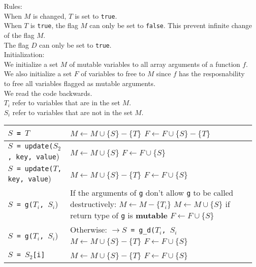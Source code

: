 \documentclass[12pt,a4paper]{article}
\newcommand{\cl}[1]{\texttt{#1}}
\newcommand{\mut}{  \textbf{ mutable } }
\begin{document}
Rules:\\
When $M$ is changed, $T$ is set to \cl{true}.\\
When $T$ is \cl{true}, the flag $M$ can only be set to \cl{false}.
This prevent infinite change of the flag $M$.\\
The flag $D$ can only be set to \cl{true}.\\



Initialization:\\


We initialize a set $M$ of mutable variables to all array arguments of a function $f$.
We also initialize a set $F$ of variables to free to $M$ since $f$ has the resposnability to free all variables flagged as mutable arguments.\\

We read the code backwards.\\
$T_i$ refer to variables that are in the set $M$.\\
$S_i$ refer to variables that are not in the set $M$.

\begin{tabular}{|p{60mm}|p{90mm}|}
\hline
\cl{$S$ = $T$} & $M \leftarrow M \cup \{ S \} - \{T\}$ \newline $F \leftarrow F \cup \{ S \} - \{T\}$  \\ \hline
\cl{$S$ = update($S_2$, key, value}) & $M \leftarrow M \cup \{ S \}$ \newline $F \leftarrow F \cup \{ S \}$ \\ \hline
\cl{$S$ = update($T$, key, value}) & $M \leftarrow M \cup \{ S \}  - \{T\}$ \newline $F \leftarrow F \cup \{ S \}$ \\ \hline

\cl{$S$ = g($T_i$, $S_i$}) & If the arguments of \cl{g} don't allow \cl{g} to be called destructively: \newline $M \leftarrow M - \{T_i \}$ \newline $M \leftarrow M \cup \{ S \}$ if return type of \cl{g} is \mut \newline $F \leftarrow F \cup \{ S\}$ \\ \hline

\cl{$S$ = g($T_i$, $S_i$}) & Otherwise: \newline \cl{$\rightarrow S$ = g\_d($T_i$, $S_i$} \newline $M \leftarrow M \cup \{ S \}  - \{T\}$ \newline $F \leftarrow F \cup \{ S \}$ \\ \hline

\cl{$S$ = $S_2$[i]} & $M \leftarrow M \cup \{ S \}  - \{T\}$ \newline $F \leftarrow F \cup \{ S \}$ \\ \hline


\end{tabular}
\end{document}

